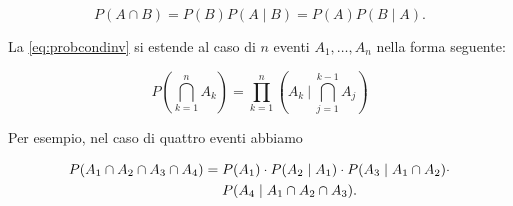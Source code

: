 \documentclass[
  11pt,
]{krantz}
\theoremstyle{definition}
\theoremstyle{definition}
\theoremstyle{definition}
\theoremstyle{definition}
\theoremstyle{remark}
\begin{document}
\begin{equation}
P(A \cap B) = P(B)P(A \mid B) = P(A)P(B \mid A).
\label{eq:probcondinv}
\end{equation}

La \eqref{eq:probcondinv} si estende al caso di \(n\) eventi \(A_1, \dots, A_n\) nella forma seguente:

\begin{equation}
P\left( \bigcap_{k=1}^n A_k \right) = \prod_{k=1}^n \left(  A_k  \ \Biggl\lvert \ \bigcap_{j=1}^{k-1} A_j \right)
\label{eq:probcomposte}
\end{equation}

Per esempio, nel caso di quattro eventi abbiamo

\begin{equation}
\begin{split}
P(A_1 \cap A_2 \cap A_3 \cap A_4) = {}& P(A_1) \cdot P(A_2 \mid A_1) \cdot  P(A_3 \mid A_1 \cap A_2) \cdot \\
 & P(A_4 \mid A_1 \cap A_2 \cap A_{3}).\notag
\end{split}
\end{equation}
\end{document}
